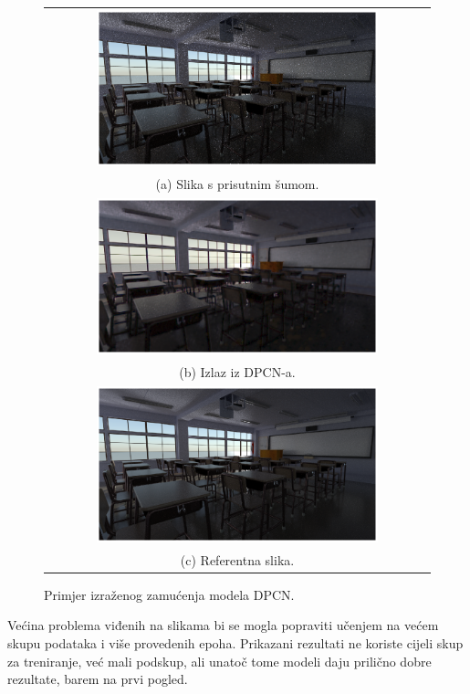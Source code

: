 \documentclass[times, utf8, seminar, numeric]{fer}
\begin{document}
\begin{figure}[H]
  \centering
\begin{tabular}{c}
  \includegraphics[width=0.75\textwidth]{eval5_in.png} \\
  (a) Slika s prisutnim šumom. \\[6pt]
  \includegraphics[width=0.75\textwidth]{eval5_dpcn.png} \\
  (b) Izlaz iz DPCN-a. \\[6pt]
  \includegraphics[width=0.75\textwidth]{eval5_ref.png} \\
  (c) Referentna slika. \\[6pt]
\end{tabular}
\caption{Primjer izraženog zamućenja modela DPCN.}
\label{fig:eval5dpcn}
\end{figure}

Većina problema viđenih na slikama bi se mogla popraviti učenjem na većem skupu podataka i
više provedenih epoha. Prikazani rezultati ne koriste cijeli skup za treniranje, već mali
podskup, ali unatoč tome modeli daju prilično dobre rezultate, barem na prvi pogled.
\end{document}
